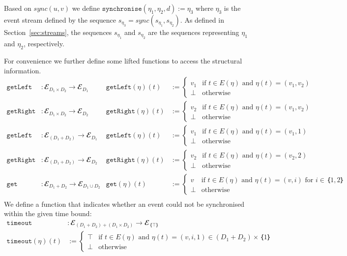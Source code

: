 Based on $sync(u,v)$ we define $\mathtt{synchronise}(η_1,η_2,d) := η_3$ where $η_3$ is the event stream defined by the sequence $s_{η_3} = sync(s_{η_1}, s_{η_2})$. 
As defined in Section~\ref{sec:streams}, the sequences $s_{η_1}$ and $s_{η_2}$ are the sequences representing $η_1$ and $η_2$, respectively.

For convenience we further define some lifted functions to access the structural information.
\begin{align*}
  \mathtt{getLeft}&: 𝓔_{D_1×D_2} → 𝓔_{D_1}
    & \mathtt{getLeft}(η)(t) &:= \begin{cases}
        v_1 & \text{if } t∈E(η) \text{ and } η(t) = (v_1,v_2)\\
        ⊥ & \text{otherwise}
      \end{cases}\\
%
  \mathtt{getRight}&: 𝓔_{D_1×D_2} → 𝓔_{D_2}
    & \mathtt{getRight}(η)(t) &:= \begin{cases}
        v_2 & \text{if } t∈E(η) \text{ and } η(t) = (v_1,v_2)\\
        ⊥ & \text{otherwise}
      \end{cases}\\
%      
  \mathtt{getLeft}&: 𝓔_{(D_1+D_2)} → 𝓔_{D_1}
    & \mathtt{getLeft}(η)(t) &:= \begin{cases}
        v_1 & \text{if } t∈E(η) \text{ and } η(t) = (v_1,1)\\
        ⊥ & \text{otherwise}
      \end{cases}\\
%
  \mathtt{getRight}&: 𝓔_{(D_1+D_2)} → 𝓔_{D_2}
    & \mathtt{getRight}(η)(t) &:= \begin{cases}
        v_2 & \text{if } t∈E(η) \text{ and } η(t) = (v_2,2)\\
        ⊥ & \text{otherwise}
      \end{cases}\\
%
  \mathtt{get}&: 𝓔_{D_1+D_2} → 𝓔_{D_1∪D_2}
    & \mathtt{get}(η)(t) &:= \begin{cases}
        v & \text{if } t∈E(η) \text{ and } η(t) = (v,i) \text{ for } i∈｛1,2｝\\
        ⊥ & \text{otherwise}
      \end{cases}\\
\end{align*}
%
We define a function that indicates whether an event could not be synchronised within the given time bound:
\begin{align*}
  \mathtt{timeout}&: 𝓔_{(D_1+D_2)+(D_1×D_2)} → 𝓔_{｛⊤｝}\\
   \mathtt{timeout}(η)(t) & := \begin{cases}
            ⊤ & \text{if } t∈E(η) \text{ and } η(t) = (v,i,1)∈(D_1+D_2)×｛1｝\\
            ⊥ & \text{otherwise}
          \end{cases}\\
\end{align*}
